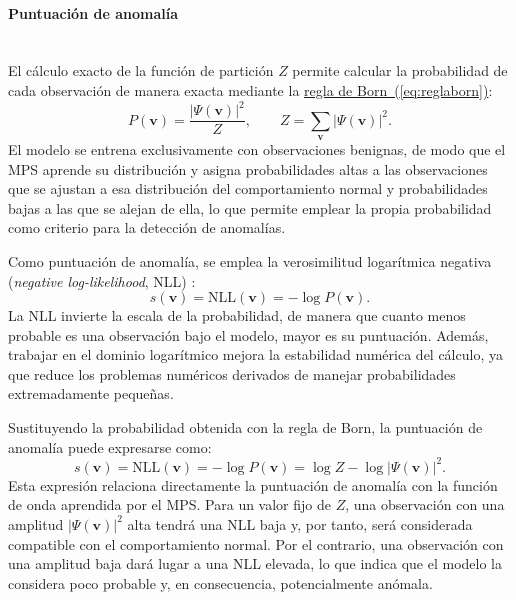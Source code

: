 \documentclass[12pt]{extarticle}
\numberwithin{equation}{section}
\begin{document}
\begin{refsection}
\paragraph{Puntuación de anomalía}
\label{par:puntuacionanomalia}
\mbox{}\\

El cálculo exacto de la función de partición $Z$ permite calcular la probabilidad de cada observación de manera exacta mediante la \hyperref[eq:reglaborn]{regla de Born~(\ref*{eq:reglaborn})}:
\begin{equation}
P(\mathbf{v}) = \frac{|\Psi(\mathbf{v})|^2}{Z},
\qquad
Z = \sum_{\mathbf{v}} |\Psi(\mathbf{v})|^2 .
\label{eq:prob}
\end{equation}
El modelo se entrena exclusivamente con observaciones benignas, de modo que el MPS aprende su distribución y asigna probabilidades altas a las observaciones que se ajustan a esa distribución del comportamiento normal y probabilidades bajas a las que se alejan de ella, lo que permite emplear la propia
probabilidad como criterio para la detección de anomalías.

Como puntuación de anomalía, se emplea la verosimilitud logarítmica negativa (\textit{negative log-likelihood}, NLL) \cite{han2018unsupervised}:
\begin{equation}
s(\mathbf{v}) = \mathrm{NLL}(\mathbf{v})
= -\log P(\mathbf{v}).
\label{eq:nll}
\end{equation}
La NLL invierte la escala de la probabilidad, de manera que cuanto menos probable es una observación bajo el modelo, mayor es su puntuación. Además, trabajar en el dominio logarítmico mejora la estabilidad numérica del cálculo, ya que reduce los problemas numéricos derivados de manejar probabilidades extremadamente pequeñas.

Sustituyendo la probabilidad obtenida con la regla de Born, la puntuación de anomalía puede expresarse como:
\begin{equation}
s(\mathbf{v}) = \mathrm{NLL}(\mathbf{v})
= -\log P(\mathbf{v})
= \log Z - \log |\Psi(\mathbf{v})|^2 .
\label{eq:nllcompleta}
\end{equation}
Esta expresión relaciona directamente la puntuación de anomalía con la función de onda aprendida por el MPS. Para un valor fijo de $Z$, una observación con una amplitud $|\Psi(\mathbf{v})|^2$ alta tendrá una NLL baja y, por tanto, será considerada compatible con el comportamiento normal. Por el contrario, una observación con una amplitud baja dará lugar a una NLL elevada, lo que indica que el modelo la considera poco probable y, en consecuencia, potencialmente anómala.


\end{refsection}
\end{document}
